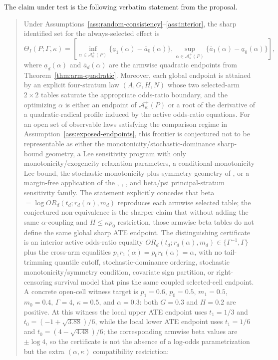 \begin{proposition}\label{prop:lee-gamma-frontier-partial}
The claim under test is the following verbatim statement from the proposal.

\begin{quote}
Under Assumptions~\ref{ass:random-consistency}--\ref{ass:interior}, the sharp identified set for the always-selected effect is
\[
  \Theta_I(P;\Gamma,\kappa)=
  \left[
    \inf_{\alpha\in\mathcal A_\kappa^+(P)}
      \{\underline a_1(\alpha)-\overline a_0(\alpha)\},
    \sup_{\alpha\in\mathcal A_\kappa^+(P)}
      \{\overline a_1(\alpha)-\underline a_0(\alpha)\}
  \right],
\]
where \(\underline a_d(\alpha)\) and \(\overline a_d(\alpha)\) are the armwise quadratic endpoints from Theorem~\ref{thm:arm-quadratic}.  Moreover, each global endpoint is attained by an explicit four-stratum law \((A,G,H,N)\) whose two selected-arm \(2\times2\) tables saturate the appropriate odds-ratio boundary, and the optimizing \(\alpha\) is either an endpoint of \(\mathcal A_\kappa^+(P)\) or a root of the derivative of a quadratic-radical profile induced by the active odds-ratio equations.
For an open set of observable laws satisfying the comparison regime in Assumption~\ref{ass:exposed-endpoints}, this frontier is conjectured not to be representable as either the \citet{HuberMellace2015SharpSelection} monotonicity/stochastic-dominance sharp-bound geometry, a \citet{LaffersNedela2017Sensitivity} Lee sensitivity program with only monotonicity/exogeneity relaxation parameters, a \citet{Semenova2025GeneralizedLee} conditional-monotonicity Lee bound, the stochastic-monotonicity-plus-symmetry geometry of \citet{Okamoto2025RobustifyLee}, or a margin-free application of the \citet{ShepherdGilbertJemiaiRotnitzky2006}, \citet{JemiaiRotnitzkyShepherdGilbert2007}, \citet{ShepherdRedmanAnkerst2008}, and \citet{ShepherdGilbertDupont2011} beta/psi principal-stratum sensitivity family.  The statement explicitly concedes that beta \(=\log OR_d(t_d;r_d(\alpha),m_d)\) reproduces each armwise selected table; the conjectured non-equivalence is the sharper claim that without adding the same \(\alpha\)-coupling and \(H\le \kappa p_0\) restriction, those armwise beta tables do not define the same global sharp ATE endpoint.  The distinguishing certificate is an interior active odds-ratio equality \(OR_d(t_d;r_d(\alpha),m_d)\in\{\Gamma^{-1},\Gamma\}\) plus the cross-arm equalities \(p_1r_1(\alpha)=p_0r_0(\alpha)=\alpha\), with no tail-trimming quantile cutoff, stochastic-dominance ordering, stochastic monotonicity/symmetry condition, covariate sign partition, or right-censoring survival model that pins the same coupled selected-cell endpoint.  A concrete open-cell witness target is \(p_1=0.6\), \(p_0=0.5\), \(m_1=0.5\), \(m_0=0.4\), \(\Gamma=4\), \(\kappa=0.5\), and \(\alpha=0.3\): both \(G=0.3\) and \(H=0.2\) are positive.  At this witness the local upper ATE endpoint uses \(t_1=1/3\) and \(t_0=(-1+\sqrt{3.88})/6\), while the local lower ATE endpoint uses \(t_1=1/6\) and \(t_0=(4-\sqrt{4.48})/6\); the corresponding armwise beta values are \(\pm\log 4\), so the certificate is not the absence of a log-odds parametrization but the extra \((\alpha,\kappa)\) compatibility restriction:

\end{quote}
\end{proposition}
